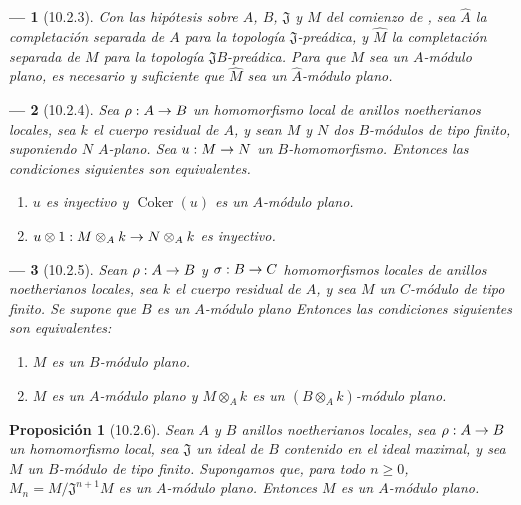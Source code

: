 \documentclass[10pt,oneside,openany]{book}
\theoremstyle{egaenv}\newtheorem*{env}{---}
\theoremstyle{egastatement}
\newtheorem*{proposition}{Proposición}
\theoremstyle{egadescription}
\renewcommand{\geq}{\geqslant}
\renewcommand{\to}{\mathchoice{\longrightarrow}{\rightarrow}{\rightarrow}{\rightarrow}}
\begin{document}
\begin{env}[10.2.3]
\label{0.10.2.3}
\label{0.10.2.3-fr}
Con las hipótesis sobre $A$, $B$, $\mathfrak{J}$ y $M$ del comienzo de , sea $\widehat A$ la completación separada de $A$ para la topología $\mathfrak{J}$-preádica, y $\widehat M$ la completación separada de $M$ para la topología $\mathfrak{J}B$-preádica.
Para que $M$ sea un $A$-módulo plano, es necesario y suficiente que $\widehat M$ sea un $\widehat A$-módulo plano.
\end{env}

\begin{env}[10.2.4]
\label{0.10.2.4}
\label{0.10.2.4-fr}
Sea $\rho:A\to B$ un homomorfismo local de anillos noetherianos locales, sea $k$ el cuerpo residual de $A$, y sean $M$ y $N$ dos $B$-módulos de tipo finito, suponiendo $N$ \emph{$A$-plano}.
Sea $u:M\to N$ un $B$-homomorfismo.
Entonces las condiciones siguientes son equivalentes.
\begin{enumerate}
  \item[(a)] $u$ es inyectivo y $\operatorname{Coker}(u)$ es un $A$-módulo plano.
  \item[(b)] $u\otimes1:M\otimes_A k\to N\otimes_A k$ es inyectivo.
\end{enumerate}
\end{env}

\begin{env}[10.2.5]
\label{0.10.2.5}
\label{0.10.2.5-fr}
Sean $\rho:A\to B$ y $\sigma:B\to C$ homomorfismos locales de anillos noetherianos locales, sea $k$ el cuerpo residual de $A$, y sea $M$ un $C$-módulo de tipo finito.
Se supone que $B$ es un $A$-módulo \emph{plano} Entonces las condiciones
siguientes son equivalentes:
\begin{enumerate}
  \item[$a)$] $M$ es un $B$-módulo plano.
  \item[$b)$] $M$ es un $A$-módulo plano y $M\otimes_A k$ es un $(B\otimes_A k)$-módulo plano.
\end{enumerate}
\end{env}

\begin{proposition}[10.2.6]
\label{0.10.2.6}
\label{0.10.2.6-fr}
Sean $A$ y $B$ anillos noetherianos locales, sea $\rho:A\to B$ un homomorfismo local, sea $\mathfrak{J}$ un ideal de $B$ contenido en el ideal maximal, y sea $M$ un $B$-módulo de tipo finito.
Supongamos que, para todo $n\geq0$, $M_n=M/\mathfrak{J}^{n+1}M$ es un $A$-módulo plano.
Entonces $M$ es un $A$-módulo plano.
\end{proposition}
\end{document}
